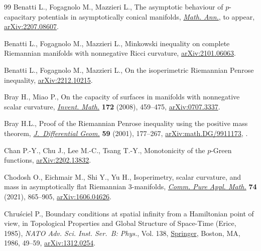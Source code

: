 \documentclass[10pt,a4paper]{amsart}
\numberwithin{equation}{section}
\begin{document}
\begin{thebibliography}{99}
Benatti L., Fogagnolo M., Mazzieri L., The asymptotic behaviour of
 {$p$}-capacitary potentials in asymptotically conical manifolds,
 \href{https://doi.org/10.1007/s00208-022-02515-4}{\textit{Math. Ann.}}, {t}o appear, \href{https://arxiv.org/abs/2207.08607}{arXiv:2207.08607}.

Benatti L., Fogagnolo M., Mazzieri L., Minkowski inequality on complete
 {R}iemannian manifolds with nonnegative {R}icci curvature,
 \href{https://arxiv.org/abs/2101.06063}{arXiv:2101.06063}.

Benatti L., Fogagnolo M., Mazzieri L., On the isoperimetric {R}iemannian
 {P}enrose inequality, \href{https://arxiv.org/abs/2212.10215}{arXiv:2212.10215}.

Bray H., Miao P., On the capacity of surfaces in manifolds with nonnegative
 scalar curvature, \href{https://doi.org/10.1007/s00222-007-0102-x}{\textit{Invent. Math.}} \textbf{172} (2008), 459--475,
 \href{https://arxiv.org/abs/0707.3337}{arXiv:0707.3337}.

Bray H.L., Proof of the {R}iemannian {P}enrose inequality using the positive
 mass theorem, \href{https://doi.org/10.4310/jdg/1090349428}{\textit{J.~Differential Geom.}} \textbf{59} (2001), 177--267,
 \href{https://arxiv.org/abs/math.DG/9911173}{arXiv:math.DG/9911173},
.

Chan P.-Y., Chu J., Lee M.-C., Tsang T.-Y., Monotonicity of the $p$-{G}reen
 functions, \href{https://arxiv.org/abs/2202.13832}{arXiv:2202.13832}.

Chodosh O., Eichmair M., Shi Y., Yu H., Isoperimetry, scalar curvature, and
 mass in asymptotically flat {R}iemannian 3-manifolds, \href{https://doi.org/10.1002/cpa.21981}{\textit{Comm. Pure
 Appl. Math.}} \textbf{74} (2021), 865--905, \href{https://arxiv.org/abs/1606.04626}{arXiv:1606.04626}.

Chru\'sciel P., Boundary conditions at spatial infinity from a {H}amiltonian
 point of view, in Topological {P}roperties and {G}lobal {S}tructure of
 {S}pace-{T}ime ({E}rice, 1985), \textit{NATO Adv. Sci. Inst. Ser.~B: Phys.},
 Vol. 138, \href{https://doi.org/10.1007/978-1-4899-3626-4_5}{Springer}, Boston, MA, 1986, 49--59, \href{https://arxiv.org/abs/1312.0254}{arXiv:1312.0254}.


\end{thebibliography}
\end{document}
